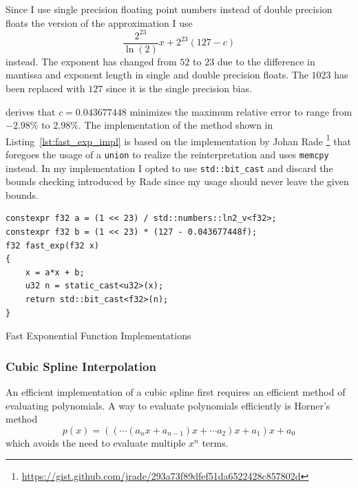 \documentclass[a4paper, 11pt]{memoir}
\begin{document}
    Since I use single precision floating point numbers instead of double precision floats the version of the
    approximation I use
    \begin{equation}
        \frac{2^{23}}{\ln{(2)}}x + 2^{23}(127 - c)
    \end{equation}
    instead. The exponent has changed from $52$ to $23$ due to the difference in mantissa and exponent length in single and
    double precision floats. The $1023$ has been replaced with $127$ since it is the single precision bias.

    \citeauthor{fast_exp} derives that $c = 0.043677448$ minimizes the maximum relative error to range from $-2.98\%$ to
    $2.98\%$. The implementation of the method shown in Listing~\ref{lst:fast_exp_impl} is based on the implementation
    by Johan Rade \footnote{\href{https://gist.github.com/jrade/293a73f89dfef51da6522428c857802d}{https://gist.github.com/jrade/293a73f89dfef51da6522428c857802d}}
    that foregoes the usage of a \texttt{union} to realize the reinterpretation and uses \texttt{memcpy}
    instead. In my implementation I opted to use \texttt{std::bit_cast} and discard the bounds checking
    introduced by Rade since my usage should never leave the given bounds.

    \begin{listing}[H]
        \begin{verbatim}
constexpr f32 a = (1 << 23) / std::numbers::ln2_v<f32>;
constexpr f32 b = (1 << 23) * (127 - 0.043677448f);
f32 fast_exp(f32 x)
{
    x = a*x + b;
    u32 n = static_cast<u32>(x);
    return std::bit_cast<f32>(n);
}
        \end{verbatim}
        \caption{Fast Exponential Function Implementations}
        \label{lst:fast_exp_impl}
    \end{listing}
    
    \subsubsection{Cubic Spline Interpolation}
    \label{sec:impl_cubic_spline}
    An efficient implementation of a cubic spline first requires an efficient method of evaluating polynomials. A way to
    evaluate polynomials efficiently is Horner's method
    \begin{equation}
        p(x) = \left(\left(\cdots\left(a_nx + a_{n-1}\right)x + \cdots a_2\right)x + a_1\right)x + a_0
        \label{eq:horners_method}
    \end{equation}
    which avoids the need to evaluate multiple $x^n$ terms.
\end{document}

